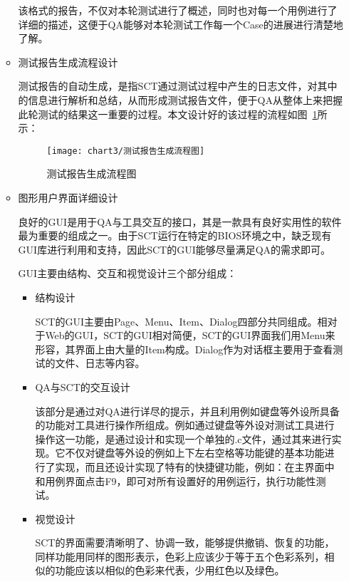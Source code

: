 \begin{itemize}
\begin{itemize}
						该格式的报告，不仅对本轮测试进行了概述，同时也对每一个用例进行了详细的描述，这便于QA能够对本轮测试工作每一个Case的进展进行清楚地了解。
					\item 测试报告生成流程设计
					
						测试报告的自动生成，是指SCT通过测试过程中产生的日志文件，对其中的信息进行解析和总结，从而形成测试报告文件，便于QA从整体上来把握此轮测试的结果这一重要的过程。本文设计好的该过程的流程如图~\ref{fig:测试报告生成流程图}所示：
						
						\begin{figure}[H] %
							\centering
							\texttt{[image: chart3/测试报告生成流程图]}
							\caption{测试报告生成流程图}
							\label{fig:测试报告生成流程图}
						\end{figure}	
						
					\item 图形用户界面详细设计
					
						良好的GUI是用于QA与工具交互的接口，其是一款具有良好实用性的软件最为重要的组成之一。由于SCT运行在特定的BIOS环境之中，缺乏现有GUI库进行利用和支持，因此SCT的GUI能够尽量满足QA的需求即可。
						
						GUI主要由结构、交互和视觉设计三个部分组成：
						\begin{itemize}
							\item 结构设计
							
								SCT的GUI主要由Page、Menu、Item、Dialog四部分共同组成。相对于Web的GUI，SCT的GUI相对简便，SCT的GUI界面我们用Menu来形容，其界面上由大量的Item构成。Dialog作为对话框主要用于查看测试的文件、日志等内容。
							\item QA与SCT的交互设计
							
								该部分是通过对QA进行详尽的提示，并且利用例如键盘等外设所具备的功能对工具进行操作所组成。例如通过键盘等外设对测试工具进行操作这一功能，是通过设计和实现一个单独的.c文件，通过其来进行实现。它不仅对键盘等外设的例如上下左右空格等功能键的基本功能进行了实现，而且还设计实现了特有的快捷键功能，例如：在主界面中和用例界面点击F9，即可对所有设置好的用例运行，执行功能性测试。
							\item 视觉设计
							
								SCT的界面需要清晰明了、协调一致，能够提供撤销、恢复的功能，同样功能用同样的图形表示，色彩上应该少于等于五个色彩系列，相似的功能应该以相似的色彩来代表，少用红色以及绿色。
						\end{itemize}
				\end{itemize}
		\end{itemize}

